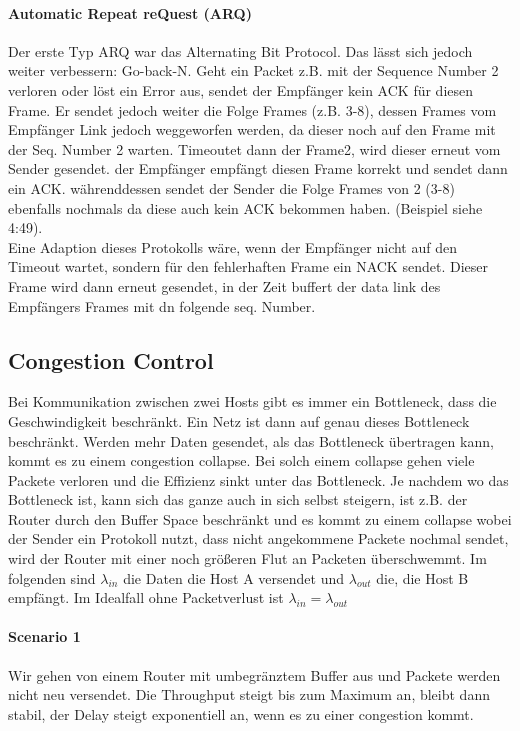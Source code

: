 		\paragraph{Automatic Repeat reQuest (ARQ)}
			Der erste Typ ARQ war das Alternating Bit Protocol. Das lässt sich jedoch weiter verbessern: Go-back-N. Geht ein Packet z.B. mit der Sequence Number 2 verloren oder löst ein Error aus, sendet der Empfänger kein ACK für diesen Frame. Er sendet jedoch weiter die Folge Frames (z.B. 3-8), dessen Frames vom Empfänger Link jedoch weggeworfen werden, da dieser noch auf den Frame mit der Seq. Number 2 warten. Timeoutet dann der Frame2, wird dieser erneut vom Sender gesendet. der Empfänger empfängt diesen Frame korrekt und sendet dann ein ACK. währenddessen sendet der Sender die Folge Frames von 2 (3-8) ebenfalls nochmals da diese auch kein ACK bekommen haben. (Beispiel siehe 4:49). \\ Eine Adaption dieses Protokolls wäre, wenn der Empfänger nicht auf den Timeout wartet, sondern für den fehlerhaften Frame ein NACK sendet. Dieser Frame wird dann erneut gesendet, in der Zeit buffert der data link des Empfängers Frames mit dn folgende seq. Number.

	\subsection{Congestion Control}
		Bei Kommunikation zwischen zwei Hosts gibt es immer ein Bottleneck, dass die Geschwindigkeit beschränkt. Ein Netz ist dann auf genau dieses Bottleneck beschränkt. Werden mehr Daten gesendet, als das Bottleneck übertragen kann, kommt es zu einem congestion collapse. Bei solch einem collapse gehen viele Packete verloren und die Effizienz sinkt unter das Bottleneck. Je nachdem wo das Bottleneck ist, kann sich das ganze auch in sich selbst steigern, ist z.B. der Router durch den Buffer Space beschränkt und es kommt zu einem collapse wobei der Sender ein Protokoll nutzt, dass nicht angekommene Packete nochmal sendet, wird der Router mit einer noch größeren Flut an Packeten überschwemmt.
		Im folgenden sind $\lambda_{in}$ die Daten die Host A versendet und $\lambda_{out}$ die, die Host B empfängt. Im Idealfall ohne Packetverlust ist $\lambda_{in}=\lambda_{out}$
		\paragraph{Scenario 1}
			Wir gehen von einem Router mit umbegränztem Buffer aus und Packete werden nicht neu versendet. Die Throughput steigt bis zum Maximum an, bleibt dann stabil, der Delay steigt exponentiell an, wenn es zu einer congestion kommt.
		

